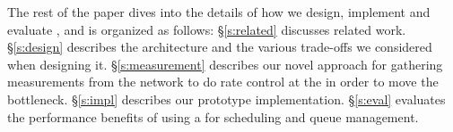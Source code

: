 The rest of the paper dives into the details of how we design, implement and evaluate \name, and is organized as follows:
\S\ref{s:related} discusses related work.
\S\ref{s:design} describes the \name architecture and the various trade-offs we considered when designing it.  
\S\ref{s:measurement} describes our novel approach for gathering measurements from the network to do rate control at the \name in order to move the bottleneck. 
\S\ref{s:impl} describes our prototype implementation. 
\S\ref{s:eval} evaluates the performance benefits of using a \name for scheduling and queue management.


















